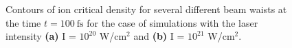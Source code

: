 \begin{figure}[h!]
	\centering
	\hspace{1mm}
	\caption{Contours of ion critical density for several different beam waists at the time $ t = 100 \ \mathrm{fs} $ for the case of simulations with the laser intensity \textbf{(a)} I = $ 10^{20} $ W/cm$^2$ and \textbf{(b)} I = $ 10^{21} $ W/cm$^2$.}
	\label{fig:15}
\end{figure}

